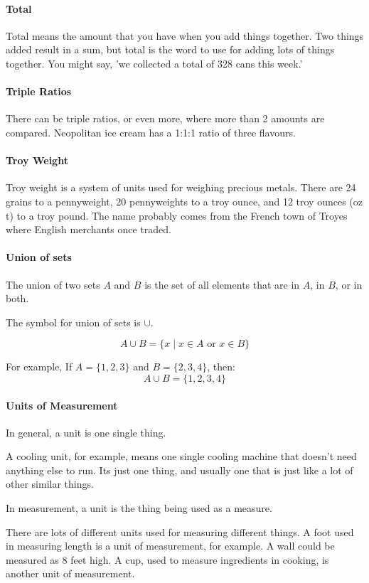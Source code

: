 \documentclass[12pt]{article}
\begin{document}
\paragraph{Total} Total means the amount that you have when you add things together. Two things added result in a sum, but total is the word to use for adding lots of things together. You might say, 'we collected a total of 328 cans this week.'

\paragraph{Triple Ratios}
There can be triple ratios, or even more, where more than 2 amounts are compared. Neopolitan ice cream has a 1:1:1 ratio of three flavours.

\paragraph{Troy Weight}
Troy weight is a system of units used for weighing precious metals. There are 24 grains to a pennyweight, 20 pennyweights to a troy ounce, and 12 troy ounces (oz t) to a troy pound. The name probably comes from the French town of Troyes where English merchants once traded.

\paragraph{Union of sets}
The union of two sets \(A\) and \(B\) is the set of all elements that are in \(A\), in \(B\), or in both.

The symbol for union of sets is $\cup$.

\[ A \cup B = \{x \mid x \in A \text{ or } x \in B\} \]

For example, If \(A = \{1, 2, 3\}\) and \(B = \{2, 3, 4\}\), then: \[ A \cup B = \{1, 2, 3, 4\} \]

\paragraph{Units of Measurement}
In general, a unit is one single thing.

A cooling unit, for example, means one single cooling machine that doesn't need anything else to run. Its just one thing, and usually one that is just like a lot of other similar things.

In measurement, a unit is the thing being used as a measure.

There are lots of different units used for measuring different things. A foot used in measuring length is a unit of measurement, for example. A wall could be measured as 8 feet high. A cup, used to measure ingredients in cooking, is another unit of measurement.
\end{document}
